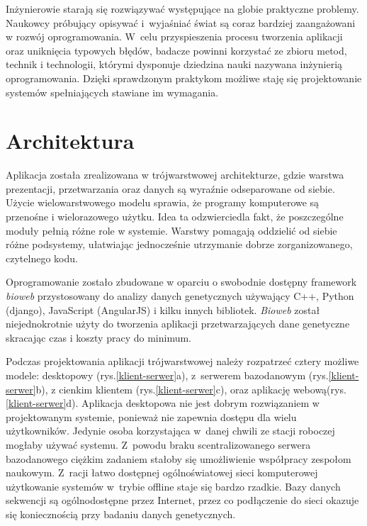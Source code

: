 \documentclass[a4paper,12pt,oneside]{mwrep}  %
\begin{document}
Inżynierowie starają się rozwiązywać występujące na globie praktyczne problemy. Naukowcy próbujący opisywać i~wyjaśniać świat są coraz bardziej zaangażowani w rozwój oprogramowania. W~celu przyspieszenia procesu tworzenia aplikacji oraz uniknięcia typowych błędów, badacze powinni korzystać ze zbioru metod, technik i technologii, którymi dysponuje dziedzina nauki nazywana inżynierią oprogramowania. Dzięki sprawdzonym praktykom możliwe staję się projektowanie systemów spełniających stawiane im wymagania.
\cite{bioweb, inz-opr-k.sacha}

\section{Architektura}
Aplikacja została zrealizowana w trójwarstwowej architekturze, gdzie warstwa prezentacji, przetwarzania oraz danych są wyraźnie odseparowane od siebie. Użycie wielowarstwowego modelu sprawia, że programy komputerowe są przenośne i wielorazowego użytku. Idea ta odzwierciedla fakt, że poszczególne moduły pełnią różne role w systemie. Warstwy pomagają oddzielić od siebie różne podsystemy, ułatwiając jednocześnie utrzymanie dobrze zorganizowanego, czytelnego kodu.
\cite{bioweb}

Oprogramowanie zostało zbudowane w oparciu o swobodnie dostępny framework \mbox{\emph{bioweb}} przystosowany do analizy danych genetycznych używający C++, Python (django), \mbox{JavaScript} (AngularJS) i kilku innych bibliotek. \emph{Bioweb} został niejednokrotnie użyty do tworzenia aplikacji przetwarzających dane genetyczne skracając czas i koszty pracy do minimum.
\cite{bioweb}

Podczas projektowania aplikacji trójwarstwowej należy rozpatrzeć cztery możliwe modele: desktopowy (rys.\ref{klient-serwer}a), z~serwerem bazodanowym (rys.\ref{klient-serwer}b), z cienkim klientem (rys.\ref{klient-serwer}c), oraz aplikację webową(rys.\ref{klient-serwer}d). Aplikacja desktopowa nie jest dobrym rozwiązaniem w projektowanym systemie, ponieważ nie zapewnia dostępu dla wielu użytkowników. Jedynie osoba korzystająca w~danej chwili ze stacji roboczej mogłaby używać systemu. Z~powodu braku scentralizowanego serwera bazodanowego ciężkim zadaniem stałoby się umożliwienie współpracy zespołom naukowym. Z~racji łatwo dostępnej ogólnoświatowej sieci komputerowej użytkowanie systemów w~trybie offline staje się bardzo rzadkie. Bazy danych sekwencji są ogólnodostępne przez Internet, przez co podłączenie do sieci okazuje się koniecznością przy badaniu danych genetycznych.
\cite{bioweb}
\end{document}
